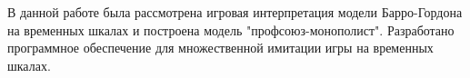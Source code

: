 В данной работе была рассмотрена игровая интерпретация модели Барро-Гордона на временных шкалах и построена модель "профсоюз-монополист". Разработано  программное обеспечение для множественной имитации игры на временных шкалах.  